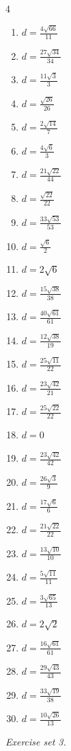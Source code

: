 \begin{multicols}{4}\raggedright
\begin{enumerate}[label=\arabic*., leftmargin=*, itemsep=1pt]
\item $d=\frac{4 \sqrt{66}}{11}$
\item $d=\frac{27 \sqrt{34}}{34}$
\item $d=\frac{11 \sqrt{3}}{3}$
\item $d=\frac{\sqrt{26}}{26}$
\item $d=\frac{2 \sqrt{14}}{7}$
\item $d=\frac{4 \sqrt{6}}{3}$
\item $d=\frac{21 \sqrt{22}}{44}$
\item $d=\frac{\sqrt{22}}{22}$
\item $d=\frac{33 \sqrt{53}}{53}$
\item $d=\frac{\sqrt{6}}{2}$
\item $d=2 \sqrt{6}$
\item $d=\frac{15 \sqrt{38}}{38}$
\item $d=\frac{40 \sqrt{61}}{61}$
\item $d=\frac{12 \sqrt{38}}{19}$
\item $d=\frac{25 \sqrt{11}}{22}$
\item $d=\frac{23 \sqrt{42}}{21}$
\item $d=\frac{25 \sqrt{22}}{22}$
\item $d=0$
\item $d=\frac{23 \sqrt{42}}{42}$
\item $d=\frac{26 \sqrt{3}}{9}$
\item $d=\frac{17 \sqrt{6}}{6}$
\item $d=\frac{21 \sqrt{22}}{22}$
\item $d=\frac{13 \sqrt{10}}{10}$
\item $d=\frac{5 \sqrt{11}}{11}$
\item $d=\frac{3 \sqrt{65}}{13}$
\item $d=2 \sqrt{2}$
\item $d=\frac{16 \sqrt{61}}{61}$
\item $d=\frac{29 \sqrt{43}}{43}$
\item $d=\frac{33 \sqrt{19}}{38}$
\item $d=\frac{10 \sqrt{26}}{13}$
\end{enumerate}
\end{multicols}
\par\noindent\emph{Exercise set 3.}\nopagebreak
